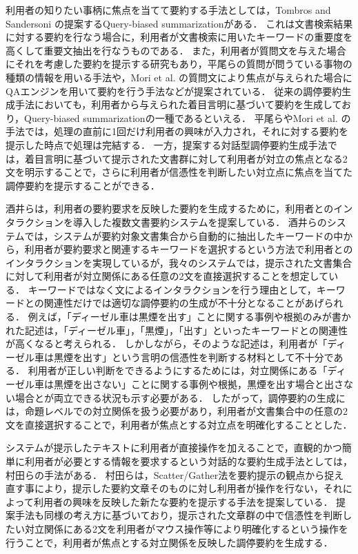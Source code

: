 \documentclass[japanese]{jnlp_1.4}
\begin{document}
利用者の知りたい事柄に焦点を当てて要約する手法としては，Tombros and Sandersoni \citeyear{Tombros1998}の提案するQuery-biased summarizationがある．
これは文書検索結果に対する要約を行なう場合に，利用者が文書検索に用いたキーワードの重要度を高くして重要文抽出を行なうものである．
また，利用者が質問文を与えた場合にそれを考慮した要約を提示する研究もあり，平尾ら\cite{Hirao2001}の質問が問うている事物の種類の情報を用いる手法や，Mori et al. \cite{Mori2005}の質問文により焦点が与えられた場合にQAエンジンを用いて要約を行う手法などが提案されている．
従来の調停要約生成手法においても，利用者から与えられた着目言明に基づいて要約を生成しており，Query-biased summarizationの一種であるといえる．
平尾ら\cite{Hirao2001}やMori et al. \citeyear{Mori2005}の手法では，処理の直前に1回だけ利用者の興味が入力され，それに対する要約を提示した時点で処理は完結する．
一方，提案する対話型調停要約生成手法では，着目言明に基づいて提示された文書群に対して利用者が対立の焦点となる2文を明示することで，さらに利用者が信憑性を判断したい対立点に焦点を当てた調停要約を提示することができる．

酒井ら\cite{Sakai2006}は，利用者の要約要求を反映した要約を生成するために，利用者とのインタラクションを導入した複数文書要約システムを提案している．
酒井ら\cite{Sakai2006}のシステムでは，システムが要約対象文書集合から自動的に抽出したキーワードの中から，利用者が要約要求と関連するキーワードを選択するという方法で利用者とのインタラクションを実現しているが，我々のシステムでは，提示された文書集合に対して利用者が対立関係にある任意の2文を直接選択することを想定している．
キーワードではなく文によるインタラクションを行う理由として，キーワードとの関連性だけでは適切な調停要約の生成が不十分となることがあげられる．
例えば，「ディーゼル車は黒煙を出す」ことに関する事例や根拠のみが書かれた記述は，「ディーゼル車」，「黒煙」，「出す」といったキーワードとの関連性が高くなると考えられる．
しかしながら，そのような記述は，利用者が「ディーゼル車は黒煙を出す」という言明の信憑性を判断する材料として不十分である．
利用者が正しい判断をできるようにするためには，対立関係にある「ディーゼル車は黒煙を出さない」ことに関する事例や根拠，黒煙を出す場合と出さない場合とが両立できる状況も示す必要がある．
したがって，調停要約の生成には，命題レベルでの対立関係を扱う必要があり，利用者が文書集合中の任意の2文を直接選択することで，利用者が焦点とする対立点を明確化することとした．

システムが提示したテキストに利用者が直接操作を加えることで，直観的かつ簡単に利用者が必要とする情報を要求するという対話的な要約生成手法としては，村田ら\cite{Murata2007}の手法がある．
村田ら\cite{Murata2007}は，Scatter/Gather法\cite{Cutting1992}を要約提示の観点から捉え直す事により，提示した要約文章そのものに対し利用者が操作を行ない，それによって利用者の興味を反映した新たな要約を提示する手法を提案している．
提案手法も同様の考え方に基づいており，提示された文章群の中で信憑性を判断したい対立関係にある2文を利用者がマウス操作等により明確化するという操作を行うことで，利用者が焦点とする対立関係を反映した調停要約を生成する．
\end{document}
